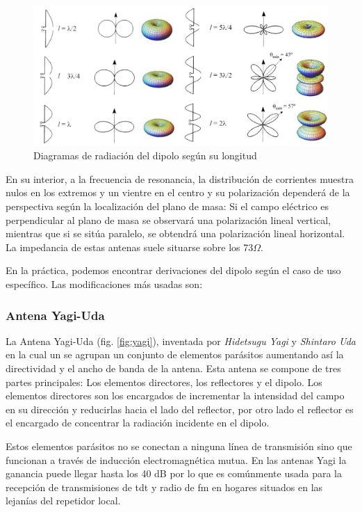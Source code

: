 \begin{figure}[h]
    \centering
        \includegraphics[width=\textwidth]{archivos/dipolo/radiaciones}
        \caption{Diagramas de radiación del dipolo según su longitud }
        \label{fig:diagramadipolo}
\end{figure}
\par En su interior, a la frecuencia de resonancia, la distribución de corrientes muestra nulos en los extremos y un vientre en el centro y su polarización dependerá de la perspectiva según la localización del plano de masa: Si el campo eléctrico es perpendicular al plano de masa se observará una polarización lineal vertical, mientras que si se sitúa paralelo, se obtendrá una polarización lineal horizontal. La impedancia de estas antenas suele situarse sobre los 73$\Omega$.
\\
\par En la práctica, podemos encontrar derivaciones del dipolo según el caso de uso específico. Las modificaciones más usadas son:

\subsubsection{Antena Yagi-Uda}

La Antena Yagi-Uda (fig. \ref{fig:yagi}), inventada por \textit{Hidetsugu Yagi} y \textit{Shintaro Uda} en la cual un se agrupan un conjunto de elementos parásitos aumentando así la directividad y el ancho de banda de la antena. Esta antena se compone de tres partes principales: Los elementos directores, los reflectores y el dipolo. Los elementos directores son los encargados de incrementar la intensidad del campo en su dirección y reducirlas hacia el lado del reflector, por otro lado el reflector es el encargado de concentrar la radiación incidente en el dipolo. 
\\
\par Estos elementos parásitos no se conectan a  ninguna línea de transmisión sino que funcionan a través de inducción electromagnética mutua. En las antenas Yagi la ganancia puede llegar hasta los 40 dB por lo que es comúnmente usada para la recepción de transmisiones de \gls{tdt} y radio de \gls{fm} en hogares situados en las lejanías del repetidor local.




